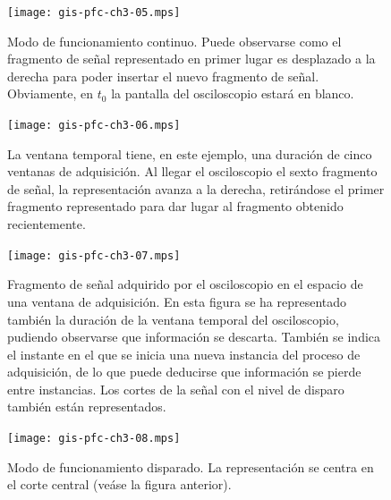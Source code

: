 \documentclass[a4paper,12pt]				{article}
\begin{document}
\clearpage

\begin{figure}
	\begin{center}
		\texttt{[image: gis-pfc-ch3-05.mps]}
	\end{center}
	\caption[Modo de funcionamiento continuo del osciloscopio]{Modo de
	funcionamiento continuo. Puede observarse como el fragmento de
	señal representado en primer lugar es desplazado a la derecha para
	poder insertar el nuevo fragmento de señal. Obviamente, en $t_0$ la
	pantalla del osciloscopio estará en blanco.}
	\label{fig:digcontosc}
\end{figure}

\begin{figure}
	\begin{center}
		\texttt{[image: gis-pfc-ch3-06.mps]}
	\end{center}
	\caption[Modo de funcionamiento continuo]{La ventana temporal
	tiene, en este ejemplo, una duración de cinco ventanas de
	adquisición. Al llegar el osciloscopio el sexto fragmento de señal,
	la representación avanza a la derecha, retirándose el primer
	fragmento representado para dar lugar al fragmento obtenido
	recientemente.}
	\label{fig:digcontosccont}
\end{figure}

\begin{figure}
	\begin{center}
		\texttt{[image: gis-pfc-ch3-07.mps]}
	\end{center}
	\caption[Fragmento de señal adquirido por el osciloscopio en el
	espacio de una ventana de adquisición]{Fragmento de señal adquirido
	por el osciloscopio en el espacio de una ventana de adquisición. En
	esta figura se ha representado también la duración de la ventana
	temporal del osciloscopio, pudiendo observarse que información se
	descarta. También se indica el instante en el que se inicia una
	nueva instancia del proceso de adquisición, de lo que puede
	deducirse que información se pierde entre instancias. Los cortes de
	la señal con el nivel de disparo también están representados.}
	\label{fig:freesignal}
\end{figure}

\begin{figure}
	\begin{center}
		\texttt{[image: gis-pfc-ch3-08.mps]}
	\end{center}
	\caption[Modo de funcionamiento disparado]{Modo de funcionamiento
	disparado. La representación se centra en el corte central (veáse
	la figura anterior).}
	\label{fig:digtrigosc}
\end{figure}
\end{document}
